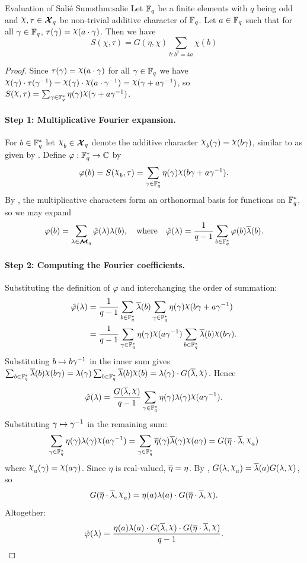 \begin{Theorem}{Evaluation of Sali\'{e} Sums}{thm:salie}
  Let $\mathbb{F}_q$ be a finite elements with $q$ being odd and $\chi,\tau\in\Xq$ be non-trivial additive character of $\mathbb{F}_q$. Let $a\in\mathbb{F}_q$ such that for all $\gamma\in\mathbb{F}_q$, $\tau(\gm)=\chi(a\cdot \gm)$. Then we have $$S(\chi,\tau)=G(\eta,\chi)\sum_{b\colon b^2=4a}\chi(b)$$
\end{Theorem}
\begin{proof}
  Since $\tau(\gm)=\chi(a\cdot\gm)$ for all $\gamma\in\mathbb{F}_q$ we have $\chi(\gm)\cdot\tau(\gm^{-1})=\chi(\gm)\cdot\chi(a\cdot\gm^{-1})=\chi(\gm+a\gm^{-1})$, so $S(\chi,\tau)=\sum_{\gm\in\bbF_q^*}\eta(\gm)\chi(\gm+a\gm^{-1})$.

  \paragraph*{Step 1: Multiplicative Fourier expansion.} For $b\in\mathbb{F}_q^*$ let $\chi_b\in\Xq$ denote the additive character $\chi_b(\gm)=\chi(b\gm)$, similar to as given by \AddCharDefthm. Define $\varphi:\mathbb{F}_q^*\to\mathbb{C}$ by
  $$\varphi(b)=S(\chi_b,\tau)=\sum_{\gm\in\bbF_q^*}\eta(\gm)\chi(b\gm+a\gm^{-1}).$$
  By \MultCharPropsthm, the multiplicative characters form an orthonormal basis for functions on $\mathbb{F}_q^*$, so we may expand
  $$\varphi(b)=\sum_{\lambda\in\boldsymbol{\mathcal{M}}_q}\hat\varphi(\lambda)\lambda(b),\quad\text{where}\quad\hat\varphi(\lambda)=\frac{1}{q-1}\sum_{b\in\mathbb{F}_q^*}\varphi(b)\overline{\lambda}(b).$$

  \paragraph*{Step 2: Computing the Fourier coefficients.} Substituting the definition of $\varphi$ and interchanging the order of summation:
  \begin{align*}
    \hat\varphi(\lm)&=\frac{1}{q-1}\sum_{b\in\bbF_q^*}\ov\lm(b)\sum_{\gm\in\bbF_q^*}\eta(\gm)\chi(b\gm+a\gm^{-1})\\
    &=\frac{1}{q-1}\sum_{\gm\in\bbF_q^*}\eta(\gm)\chi(a\gm^{-1})\sum_{b\in\bbF_q^*}\ov\lm(b)\chi(b\gm).
  \end{align*}
  Substituting $b\mapsto b\gamma^{-1}$ in the inner sum gives $\sum_{b\in\bbF_q^*}\ov\lm(b)\chi(b\gm)=\lm(\gm)\sum_{b\in\bbF_q^*}\ov\lm(b)\chi(b)=\lm(\gm)\cdot G(\ov\lm,\chi)$. Hence
  $$\hat\varphi(\lm)=\frac{G(\ov\lm,\chi)}{q-1}\sum_{\gm\in\bbF_q^*}\eta(\gm)\lm(\gm)\chi(a\gm^{-1}).$$
  Substituting $\gamma\mapsto\gamma^{-1}$ in the remaining sum:
  $$\sum_{\gm\in\bbF_q^*}\eta(\gm)\lm(\gm)\chi(a\gm^{-1})=\sum_{\gm\in\bbF_q^*}\ov\eta(\gm)\ov\lm(\gm)\chi(a\gm)=G(\ov\eta\cdot\ov\lm,\chi_a)$$
  where $\chi_a(\gm)=\chi(a\gm)$. Since $\eta$ is real-valued, $\overline{\eta}=\eta$. By \GSidentitieslem[(i)], $G(\lm,\chi_a)=\ov\lm(a)G(\lm,\chi)$, so
  $$G(\ov\eta\cdot\ov\lm,\chi_a)=\eta(a)\lm(a)\cdot G(\ov\eta\cdot\ov\lm,\chi).$$
  Altogether:
  \begin{equation}\label{eq:salie-fourier-coeff}
    \hat\varphi(\lm)=\frac{\eta(a)\lm(a)\cdot G(\ov\lm,\chi)\cdot G(\ov\eta\cdot\ov\lm,\chi)}{q-1}.
  \end{equation}


\end{proof}
